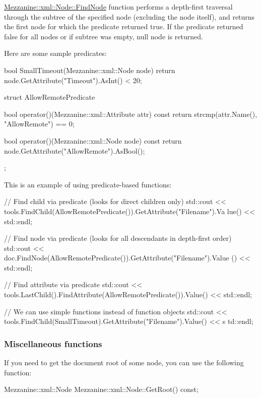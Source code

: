  \par
 \hyperlink{classMezzanine_1_1xml_1_1Node_a0f241f6570fd68540578859c189155c8}{Mezzanine::xml::Node::FindNode} function performs a depth-\/first traversal through the subtree of the specified node (excluding the node itself), and returns the first node for which the predicate returned true. If the predicate returned false for all nodes or if subtree was empty, null node is returned. \par
 \par
 Here are some sample predicates: 
\begin{DoxyCode}
 bool SmallTimeout(Mezzanine::xml::Node node)
 {
     return node.GetAttribute("Timeout").AsInt() < 20;
 }

 struct AllowRemotePredicate
 {
     bool operator()(Mezzanine::xml::Attribute attr) const
     {
         return strcmp(attr.Name(), "AllowRemote") == 0;
     }

     bool operator()(Mezzanine::xml::Node node) const
     {
         return node.GetAttribute("AllowRemote").AsBool();
     }
 };
\end{DoxyCode}
 This is an example of using predicate-\/based functions: 
\begin{DoxyCode}
 // Find child via predicate (looks for direct children only)
 std::cout << tools.FindChild(AllowRemotePredicate()).GetAttribute("Filename").Va
      lue() << std::endl;

 // Find node via predicate (looks for all descendants in depth-first order)
 std::cout << doc.FindNode(AllowRemotePredicate()).GetAttribute("Filename").Value
      () << std::endl;

 // Find attribute via predicate
 std::cout << tools.LastChild().FindAttribute(AllowRemotePredicate()).Value() << 
      std::endl;

 // We can use simple functions instead of function objects
 std::cout << tools.FindChild(SmallTimeout).GetAttribute("Filename").Value() << s
      td::endl;
\end{DoxyCode}
 \hypertarget{XMLManual_XMLAccessingMisc}{}\subsubsection{Miscellaneous functions}\label{XMLManual_XMLAccessingMisc}
If you need to get the document root of some node, you can use the following function: 
\begin{DoxyCode}
 Mezzanine::xml::Node Mezzanine::xml::Node::GetRoot() const;
\end{DoxyCode}
